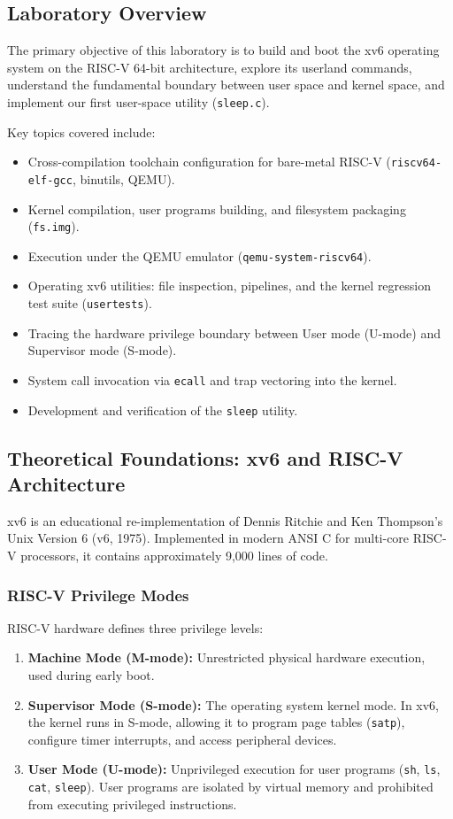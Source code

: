 \documentclass[12pt,a4paper]{article}
\begin{document}
\subsection{Laboratory Overview}
The primary objective of this laboratory is to build and boot the xv6 operating system on the RISC-V 64-bit architecture, explore its userland commands, understand the fundamental boundary between user space and kernel space, and implement our first user-space utility (\texttt{sleep.c}).

Key topics covered include:
\begin{itemize}
    \item Cross-compilation toolchain configuration for bare-metal RISC-V (\texttt{riscv64-elf-gcc}, binutils, QEMU).
    \item Kernel compilation, user programs building, and filesystem packaging (\texttt{fs.img}).
    \item Execution under the QEMU emulator (\texttt{qemu-system-riscv64}).
    \item Operating xv6 utilities: file inspection, pipelines, and the kernel regression test suite (\texttt{usertests}).
    \item Tracing the hardware privilege boundary between User mode (U-mode) and Supervisor mode (S-mode).
    \item System call invocation via \texttt{ecall} and trap vectoring into the kernel.
    \item Development and verification of the \texttt{sleep} utility.
\end{itemize}

\subsection{Theoretical Foundations: xv6 and RISC-V Architecture}
xv6 is an educational re-implementation of Dennis Ritchie and Ken Thompson's Unix Version 6 (v6, 1975). Implemented in modern ANSI C for multi-core RISC-V processors, it contains approximately 9,000 lines of code.

\subsubsection{RISC-V Privilege Modes}
RISC-V hardware defines three privilege levels:
\begin{enumerate}
    \item \textbf{Machine Mode (M-mode):} Unrestricted physical hardware execution, used during early boot.
    \item \textbf{Supervisor Mode (S-mode):} The operating system kernel mode. In xv6, the kernel runs in S-mode, allowing it to program page tables (\texttt{satp}), configure timer interrupts, and access peripheral devices.
    \item \textbf{User Mode (U-mode):} Unprivileged execution for user programs (\texttt{sh}, \texttt{ls}, \texttt{cat}, \texttt{sleep}). User programs are isolated by virtual memory and prohibited from executing privileged instructions.
\end{enumerate}
\end{document}

